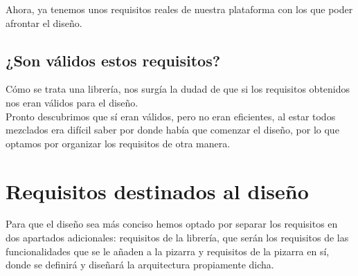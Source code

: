 Ahora, ya tenemos unos requisitos reales de nuestra plataforma con los que poder afrontar el diseño.

\subsection{¿Son válidos estos requisitos?}

Cómo se trata una librería, nos surgía la dudad de que si los requisitos obtenidos nos eran válidos para el diseño.\\

Pronto descubrimos que sí eran válidos, pero no eran eficientes, al estar todos mezclados era difícil saber por donde había que comenzar el diseño, por lo que optamos por organizar los requisitos de otra manera.

\section{Requisitos destinados al diseño}\label{reqdiseño}

Para que el diseño sea más conciso hemos optado por separar los requisitos en dos apartados adicionales: requisitos de la librería, que serán los requisitos de las funcionalidades que se le añaden a la pizarra y requisitos de la pizarra en sí, donde se definirá y diseñará la arquitectura propiamente dicha. 

